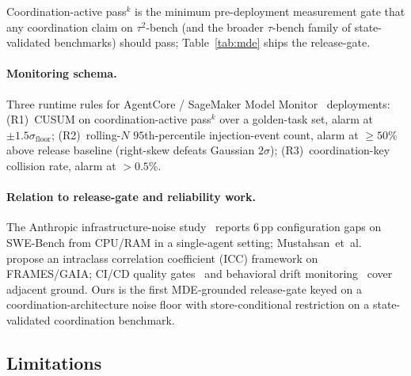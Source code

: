 Coordination-active pass$^k$ is the minimum pre-deployment
measurement gate that any coordination claim on $\tau^2$-bench
(and the broader $\tau$-bench family of state-validated
benchmarks) should pass; Table~\ref{tab:mde} ships the
release-gate.

\paragraph{Monitoring schema.}
Three runtime rules for AgentCore / SageMaker Model
Monitor~\cite{sagemaker_monitor2022} deployments:
(R1)~CUSUM on coordination-active pass$^k$ over a golden-task
set, alarm at $\pm 1.5\sigma_{\textrm{floor}}$;
(R2)~rolling-$N$ $95$th-percentile injection-event count, alarm
at $\geq 50\%$ above release baseline (right-skew defeats
Gaussian $2\sigma$);
(R3)~coordination-key collision rate, alarm at $>0.5\%$.

\paragraph{Relation to release-gate and reliability work.}
The Anthropic infrastructure-noise
study~\cite{anthropicnoise2026} reports $6$\,pp configuration
gaps on SWE-Bench from CPU/RAM in a single-agent setting;
Mustahsan~et~al.~\cite{mustahsan2025stochasticity} propose an
intraclass correlation coefficient (ICC) framework on
FRAMES/GAIA; CI/CD quality
gates~\cite{selftestquality2026} and behavioral drift
monitoring~\cite{agentdrift2026} cover adjacent ground. Ours is
the first MDE-grounded release-gate keyed on a
coordination-architecture noise floor with store-conditional
restriction on a state-validated coordination benchmark.

\subsection{Limitations}
\label{sec:eval:limits}

